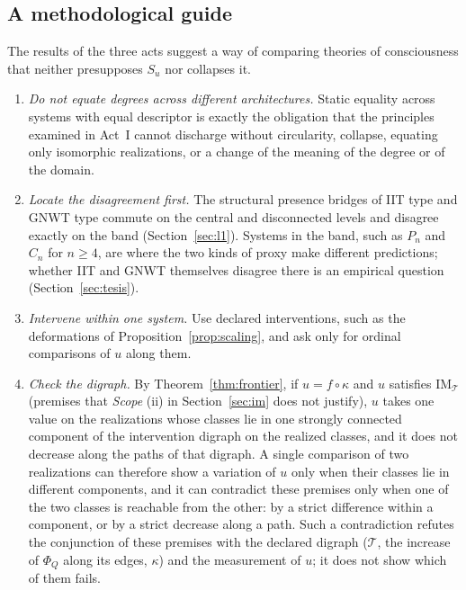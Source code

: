 \subsection{A methodological guide}\label{sec:guide}
The results of the three acts suggest a way of comparing theories of consciousness that neither presupposes $S_u$ nor collapses it.
\begin{enumerate}
\item \emph{Do not equate degrees across different architectures.} Static equality across systems with equal descriptor is exactly the obligation that the principles examined in Act~I cannot discharge without circularity, collapse, equating only isomorphic realizations, or a change of the meaning of the degree or of the domain.
\item \emph{Locate the disagreement first.} The structural presence bridges of IIT type and GNWT type commute on the central and disconnected levels and disagree exactly on the band (Section~\ref{sec:l1}). Systems in the band, such as $P_n$ and $C_n$ for $n\ge4$, are where the two kinds of proxy make different predictions; whether IIT and GNWT themselves disagree there is an empirical question (Section~\ref{sec:tesis}).
\item \emph{Intervene within one system.} Use declared interventions, such as the deformations of Proposition~\ref{prop:scaling}, and ask only for ordinal comparisons of $u$ along them.
\item \emph{Check the digraph.} By Theorem~\ref{thm:frontier}, if $u=f\circ\kappa$ and $u$ satisfies $\mathrm{IM}_{\mathcal T}$ (premises that \emph{Scope} (ii) in Section~\ref{sec:im} does not justify), $u$ takes one value on the realizations whose classes lie in one strongly connected component of the intervention digraph on the realized classes, and it does not decrease along the paths of that digraph. A single comparison of two realizations can therefore show a variation of $u$ only when their classes lie in different components, and it can contradict these premises only when one of the two classes is reachable from the other: by a strict difference within a component, or by a strict decrease along a path. Such a contradiction refutes the conjunction of these premises with the declared digraph ($\mathcal T$, the increase of $\Phi_Q$ along its edges, $\kappa$) and the measurement of $u$; it does not show which of them fails.
\end{enumerate}

